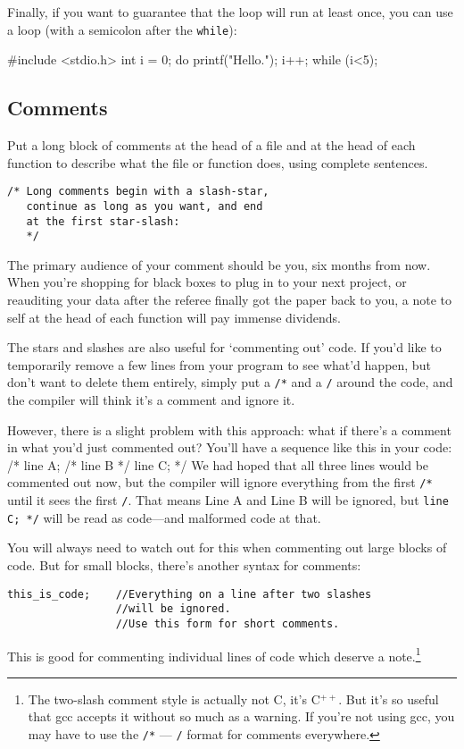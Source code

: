 \documentclass[12pt]{article}
\makeatletter
\def\ttind#1{\index{#1@{\tt #1}}{\tt #1}}
\makeatother
\begin{document}
Finally, if you want to guarantee that the loop will run at least once, you can use a \ttind{do-while} loop (with a semicolon after the {\tt while}):

#include <stdio.h>
int i = 0;
do {
    printf("Hello.\n");
    i++;
} while (i<5);

\subsection{Comments} 
Put a long block of comments 
at the head of a file and at the head of each function to describe what
the file or function does, using complete sentences.
\begin{verbatim}
/* Long comments begin with a slash-star,
   continue as long as you want, and end 
   at the first star-slash:   
   */
\end{verbatim}
The primary audience of your comment should be you, six months from
now. When you're shopping for black boxes to plug in to your next project,
or reauditing your data after the referee finally got the paper back
to you, a note to self at the head of each function will pay immense
dividends.


The stars and slashes are also useful for `commenting out' code. If you'd
like to temporarily remove a few lines from your program to see what'd
happen, but don't want to delete them entirely, simply put a {\tt /*}
and a {\tt */} around the code, and the compiler will think it's a
comment and ignore it.

However, there is a slight problem with this approach: what if there's a comment in what you'd just
commented out? You'll have a sequence like this in your code: 
/* line A; 
   /* line B */ 
   line C; 
*/
We had hoped that all three lines would be commented out now, but the compiler will ignore everything
from the first {\tt /*} until it sees the first {\tt */}. That means Line A and Line B will be ignored,
but {\tt line C; */} will be read as code---and malformed code at that.

You will always need to watch out for this when commenting out large blocks of code. But for small
blocks, there's another syntax for comments:
\begin{verbatim}
this_is_code;    //Everything on a line after two slashes 
                 //will be ignored.
                 //Use this form for short comments.
\end{verbatim}
This is good for commenting individual lines of code which deserve a note.\footnote{The two-slash
comment style is actually not C, it's C$^{++}$. But it's so useful that gcc accepts it without so much as
a warning. If you're not using gcc, you may have to use the {\tt /*} --- {\tt */} format for comments
everywhere.}
\end{document}
